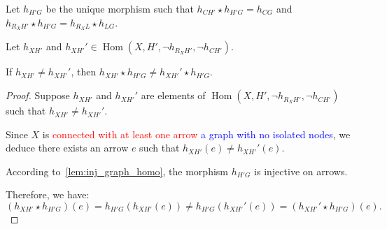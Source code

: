 \begin{lemma}
    \label{lem:1_dist}
    
            

    Let $h_{H'G}$ be the unique morphism such that $h_{CH'} \mathop{\star} h_{H'G} \mathop{=} h_{CG}$ and $h_{R_XH'} \mathop{\star} h_{H'G} \mathop{=} h_{R_XL} \mathop{\star} h_{LG}$.

    Let $h_{XH'}$ and $h_{XH'}' \mathop{\in} \operatorname{Hom}(X, H', \lnot h_{R_XH'}, \lnot h_{CH'})$. 
    
    If $h_{XH'} \mathop{\neq} h_{XH'}'$, then $h_{XH'} \mathop{\star} h_{H'G} \mathop{\neq} h_{XH'}' \mathop{\star} h_{H'G}$.
    
\end{lemma}

\begin{proof}
    Suppose $h_{XH'}$ and $h_{XH'}'$ are elements of $\operatorname{Hom}(X, H', \lnot h_{R_XH'}, \lnot h_{CH'})$ such that $h_{XH'} \mathop{\neq} h_{XH'}'$.

    Since $X$ is \textcolor{red}{connected with at least one arrow} \textcolor{blue}{a graph with no isolated nodes}, we deduce there exists an arrow $e$ such that $h_{XH'}(e) \mathop{\neq} h_{XH'}'(e)$.

    According to~\autoref{lem:inj_graph_homo}, the morphism $h_{H'G}$ is injective on arrows.
    
    Therefore, we have:
    \[
    (h_{XH'} \mathop{\star} h_{H'G})(e) \mathop{=} h_{H'G}(h_{XH'}(e)) \mathop{\neq} h_{H'G}(h_{XH'}'(e)) \mathop{=} (h_{XH'}' \mathop{\star} h_{H'G})(e).
    \]
\end{proof}



